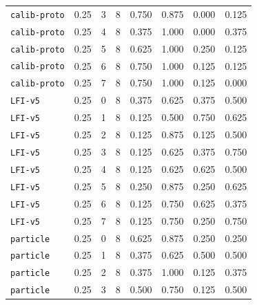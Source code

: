 \documentclass{article}
\begin{document}
\begin{center}
{\begin{tabular}{llllcccc}
\texttt{calib-proto} & 0.25 & 3 & 8 & 0.750 & 0.875 & 0.000 & 0.125 \\
\texttt{calib-proto} & 0.25 & 4 & 8 & 0.375 & 1.000 & 0.000 & 0.375 \\
\texttt{calib-proto} & 0.25 & 5 & 8 & 0.625 & 1.000 & 0.250 & 0.125 \\
\texttt{calib-proto} & 0.25 & 6 & 8 & 0.750 & 1.000 & 0.125 & 0.125 \\
\texttt{calib-proto} & 0.25 & 7 & 8 & 0.750 & 1.000 & 0.125 & 0.000 \\
\texttt{LFI-v5} & 0.25 & 0 & 8 & 0.375 & 0.625 & 0.375 & 0.500 \\
\texttt{LFI-v5} & 0.25 & 1 & 8 & 0.125 & 0.500 & 0.750 & 0.625 \\
\texttt{LFI-v5} & 0.25 & 2 & 8 & 0.125 & 0.875 & 0.125 & 0.500 \\
\texttt{LFI-v5} & 0.25 & 3 & 8 & 0.125 & 0.625 & 0.375 & 0.750 \\
\texttt{LFI-v5} & 0.25 & 4 & 8 & 0.125 & 0.625 & 0.625 & 0.500 \\
\texttt{LFI-v5} & 0.25 & 5 & 8 & 0.250 & 0.875 & 0.250 & 0.625 \\
\texttt{LFI-v5} & 0.25 & 6 & 8 & 0.125 & 0.750 & 0.625 & 0.375 \\
\texttt{LFI-v5} & 0.25 & 7 & 8 & 0.125 & 0.750 & 0.250 & 0.750 \\
\texttt{particle} & 0.25 & 0 & 8 & 0.625 & 0.875 & 0.250 & 0.250 \\
\texttt{particle} & 0.25 & 1 & 8 & 0.375 & 0.625 & 0.500 & 0.500 \\
\texttt{particle} & 0.25 & 2 & 8 & 0.375 & 1.000 & 0.125 & 0.375 \\
\texttt{particle} & 0.25 & 3 & 8 & 0.500 & 0.750 & 0.125 & 0.500 \\
\bottomrule
\end{tabular}%
}
\end{center}
\end{document}
